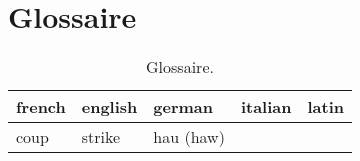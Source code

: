 \chapter{Glossaire}

\begin{table}[h]
	\centering
	\begin{tabular}{lllll}
		french &
			english &
			german &
			italian &
			latin \\
		\hline
		coup &
			strike &
			hau (haw) &
			&
			
	\end{tabular}
	\caption{Glossaire.}
\end{table}


